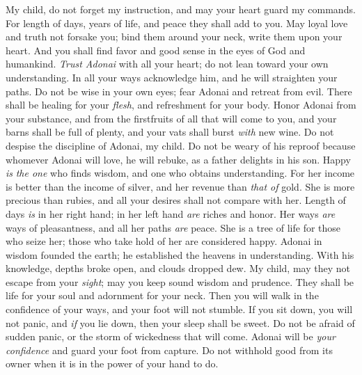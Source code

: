\begin{biblechapter} %
 My child, do not forget my instruction, 
and may your heart guard my commands.
\verse For length of days, years of life, 
and peace they shall add to you.
\verse May loyal love and truth not forsake you; 
bind them around your neck, 
write them upon your heart.
\verse And you shall find favor and good sense 
in the eyes of God and humankind.
\verse \textit{Trust Adonai} with all your heart; 
do not lean toward your own understanding.
\verse In all your ways acknowledge him, 
and he will straighten your paths.
\verse Do not be wise in your own eyes; 
fear Adonai and retreat from evil.
\verse There shall be healing for your \textit{flesh}, 
and refreshment for your body.
\verse Honor Adonai from your substance, 
and from the firstfruits of all that will come to you,
\verse and your barns shall be full of plenty, 
and your vats shall burst \textit{with} new wine.
 Do not despise the discipline of Adonai, my child. 
Do not be weary of his reproof
\verse because whomever Adonai will love, he will rebuke, 
as a father delights in his son.
\verse Happy \textit{is} \textit{the one} who finds wisdom, 
and one who obtains understanding.
\verse For her income is better than the income of silver, 
and her revenue than \textit{that of} gold.
\verse She is more precious than rubies, 
and all your desires shall not compare with her.
\verse Length of days \textit{is} in her right hand; 
in her left hand \textit{are} riches and honor.
\verse Her ways \textit{are} ways of pleasantness, 
and all her paths \textit{are} peace.
\verse She is a tree of life for those who seize her; 
those who take hold of her are considered happy.
 Adonai in wisdom founded the earth; 
he established the heavens in understanding.
\verse With his knowledge, depths broke open, 
and clouds dropped dew.
\verse My child, may they not escape from your \textit{sight}; 
may you keep sound wisdom and prudence.
\verse They shall be life for your soul 
and adornment for your neck.
\verse Then you will walk in the confidence of your ways, 
and your foot will not stumble.
\verse If you sit down, you will not panic, 
and \textit{if} you lie down, then your sleep shall be sweet.
\verse Do not be afraid of sudden panic, 
or the storm of wickedness that will come.
\verse Adonai will be \textit{your confidence} 
and guard your foot from capture.
\verse Do not withhold good from its owner 
when it is in the power of your hand to do.

\end{biblechapter}
